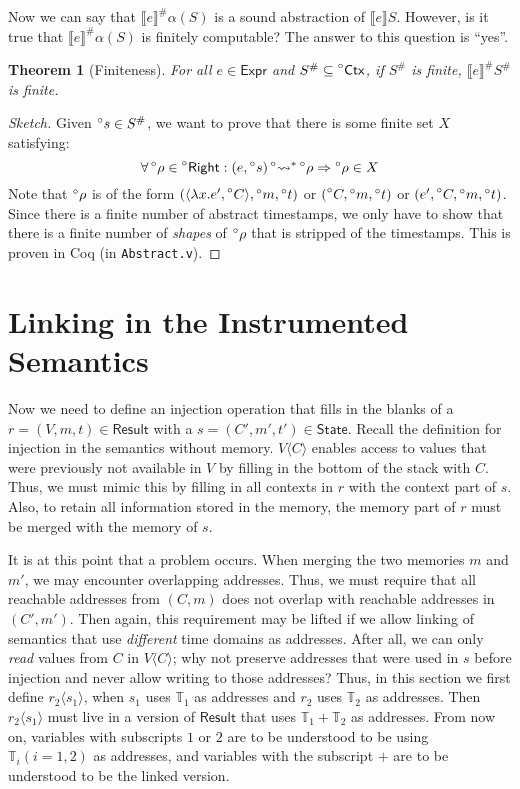 \documentclass[acmsmall,review]{acmart}\settopmatter{printfolios=true,printccs=false,printacmref=false}
\theoremstyle{definition}
\theoremstyle{plain}
\newtheorem{thm}{Theorem}[section]
\newcommand*{\A}[1]{\prescript{\circ}{}{#1}}
\newcommand*{\Abs}[1]{{#1}^{\#}}
\newcommand*{\Expr}{\mathsf{Expr}}
\newcommand*{\Time}{\mathbb{T}}
\newcommand*{\Ctx}{\mathsf{Ctx}}
\newcommand*{\Right}{\mathsf{Right}}
\newcommand*{\mem}{m}
\newcommand*{\State}{\mathsf{State}}
\newcommand*{\Result}{\mathsf{Result}}
\newcommand*{\semarrow}{\rightsquigarrow}
\newcommand*{\sembracket}[1]{\lBrack{#1}\rBrack}
\newcommand*{\inject}[2]{{#2}\langle{#1}\rangle}
\begin{document}
Now we can say that $\Abs{\sembracket{e}}\alpha(S)$ is a sound abstraction of $\sembracket{e}S$.
However, is it true that $\Abs{\sembracket{e}}\alpha(S)$ is finitely computable?
The answer to this question is ``yes''.

\begin{thm}[Finiteness]
  For all $e\in\Expr$ and $\Abs{S}\subseteq\A\Ctx$, if $\Abs{S}$ is finite, $\Abs{\sembracket{e}}\Abs{S}$ is finite.
\end{thm}
\begin{proof}[Sketch]
  Given $\A{s}\in\Abs{S}$, we want to prove that there is some finite set $X$ satisfying:
  \[\forall \A\rho\in\A\Right:(e,\A{s})\A\semarrow^*\A\rho\Rightarrow\A\rho\in X\]
  Note that $\A\rho$ is of the form $(\langle\lambda x.e',\A{C}\rangle,\A\mem,\A{t})$ or $(\A{C},\A\mem,\A{t})$ or $(e',\A{C},\A\mem,\A{t})$.
  Since there is a finite number of abstract timestamps, we only have to show that there is a finite number of \emph{shapes} of $\A\rho$ that is stripped of the timestamps.
  This is proven in Coq (in \texttt{Abstract.v}).
\end{proof}

\section{Linking in the Instrumented Semantics}
Now we need to define an injection operation that fills in the blanks of a $r=(V,\mem,t)\in\Result$ with a $s=(C',\mem',t')\in\State$.
Recall the definition for injection in the semantics without memory.
$\inject{C}{V}$ enables access to values that were previously not available in $V$ by filling in the bottom of the stack with $C$.
Thus, we must mimic this by filling in all contexts in $r$ with the context part of $s$.
Also, to retain all information stored in the memory, the memory part of $r$ must be merged with the memory of $s$.

It is at this point that a problem occurs.
When merging the two memories $\mem$ and $\mem'$, we may encounter overlapping addresses.
Thus, we must require that all reachable addresses from $(C,\mem)$ does not overlap with reachable addresses in $(C',\mem')$.
Then again, this requirement may be lifted if we allow linking of semantics that use \emph{different} time domains as addresses.
After all, we can only \emph{read} values from $C$ in $\inject{C}{V}$; why not preserve addresses that were used in $s$ before injection and never allow writing to those addresses?
Thus, in this section we first define $\inject{s_1}{r_2}$, when $s_1$ uses $\Time_1$ as addresses and $r_2$ uses $\Time_2$ as addresses.
Then $\inject{s_1}{r_2}$ must live in a version of $\Result$ that uses $\Time_1+\Time_2$ as addresses.
From now on, variables with subscripts $1$ or $2$ are to be understood to be using $\Time_i(i=1,2)$ as addresses, and variables with the subscript $+$ are to be understood to be the linked version.
\end{document}
